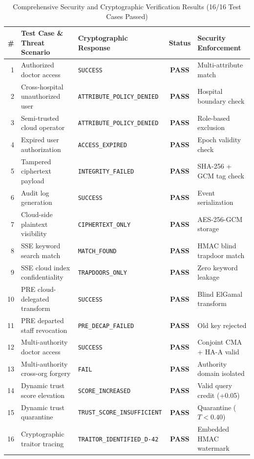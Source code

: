 \documentclass[10pt,twocolumn]{article}
\begin{document}
\begin{table}[!t]
\centering
\caption{Comprehensive Security and Cryptographic Verification Results (16/16 Test Cases Passed)}
\label{tab:security_tests}
\small
\begin{tabularx}{\textwidth}{r X X c l}
\toprule
\textbf{\#} & \textbf{Test Case \& Threat Scenario} & \textbf{Cryptographic Response} & \textbf{Status} & \textbf{Security Enforcement} \\
\midrule
1 & Authorized doctor access & \texttt{SUCCESS} & \textbf{PASS} & Multi-attribute match \\
2 & Cross-hospital unauthorized user & \texttt{ATTRIBUTE\_POLICY\_DENIED} & \textbf{PASS} & Hospital boundary check \\
3 & Semi-trusted cloud operator & \texttt{ATTRIBUTE\_POLICY\_DENIED} & \textbf{PASS} & Role-based exclusion \\
4 & Expired user authorization & \texttt{ACCESS\_EXPIRED} & \textbf{PASS} & Epoch validity check \\
5 & Tampered ciphertext payload & \texttt{INTEGRITY\_FAILED} & \textbf{PASS} & SHA-256 + GCM tag check \\
6 & Audit log generation & \texttt{SUCCESS} & \textbf{PASS} & Event serialization \\
7 & Cloud-side plaintext visibility & \texttt{CIPHERTEXT\_ONLY} & \textbf{PASS} & AES-256-GCM storage \\
8 & SSE keyword search match & \texttt{MATCH\_FOUND} & \textbf{PASS} & HMAC blind trapdoor match \\
9 & SSE cloud index confidentiality & \texttt{TRAPDOORS\_ONLY} & \textbf{PASS} & Zero keyword leakage \\
10 & PRE cloud-delegated transform & \texttt{SUCCESS} & \textbf{PASS} & Blind ElGamal transform \\
11 & PRE departed staff revocation & \texttt{PRE\_DECAP\_FAILED} & \textbf{PASS} & Old key rejected \\
12 & Multi-authority doctor access & \texttt{SUCCESS} & \textbf{PASS} & Conjoint CMA + HA-A valid \\
13 & Multi-authority cross-org forgery & \texttt{FAIL} & \textbf{PASS} & Authority domain isolated \\
14 & Dynamic trust score elevation & \texttt{SCORE\_INCREASED} & \textbf{PASS} & Valid query credit (+0.05) \\
15 & Dynamic trust quarantine & \texttt{TRUST\_SCORE\_INSUFFICIENT} & \textbf{PASS} & Quarantine ($T < 0.40$) \\
16 & Cryptographic traitor tracing & \texttt{TRAITOR\_IDENTIFIED\_D-42} & \textbf{PASS} & Embedded HMAC watermark \\
\bottomrule
\end{tabularx}
\end{table}
\end{document}
